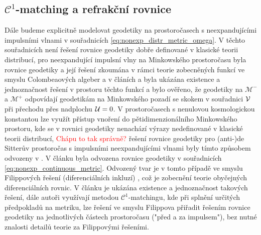 \subsection{$\mathcal{C}^1$-matching a refrakční rovnice}
Dále budeme explicitně modelovat geodetiky na prostoročasech s neexpandujícími impulsními vlnami v souřadnicích
\eqref{eq:nonexp_distr_metric_omega}. V těchto souřadnicích není řešení rovnice geodetiky dobře definované v
klasické teorii distribucí, pro neexpandující impulsní vlny na Minkowského prostoročasu byla rovnice geodetiky
a její řešení zkoumána v rámci teorie zobecněných funkcí ve smyslu Colombeaových algeber a v článích \cite{Steinbauer_1998} a \cite{Kunzinger_1999}
byla ukázána existence a jednoznačnost řešení v prostoru těchto funkcí a bylo ověřeno, že geodetiky na $\mathcal{M}^-$ a $\mathcal{M}^+$ odpovídají
geodetikám na Minkowského pozadí se skokem v souřadnici $\mathcal{V}$ při přechodu přes nadplochu $\mathcal{U}=0$. V prostoročasech s
nenulovou kosmologickou konstantou lze využít přístup vnoření do pětidimenzionálního Minkowského prostoru, kde se v rovnici
geodetiky nenachází výrazy nedefinované v klasické teorii distribucí, \textcolor{red}{Chápu to tak správně?} řešení rovnice geodetiky
pro (anti-)de Sitterův prostoročas s impulsními neexpandujícími vlnami byly tímto způsobem odvozeny v \cite{Podolsk__2001}.
V článku \cite{Podolsky:2014ysa} byla odvozena rovnice geodetiky v souřadnicích \eqref{eq:nonexp_continuous_metric}.
Odvozený tvar je v tomto případě ve smyslu Filippových řešení (diferenciálních inkluzí) \cite{filippov1988differential}, což je zobecnění teorie obyčejných diferenciálních rovnic.
V článku je ukázána existence a jednoznačnost takových řešení, dále autoři využívají metodou $\mathcal{C}^1$-matchingu,
kde při splnění určitých předpokladů na metriku, lze řešení ve smyslu Filippova přiřadit řešením rovnice geodetiky na jednotlivých částech prostoročasu
("před a za impulsem"), bez nutné znalosti detailů teorie za Filippovými řešeními.

